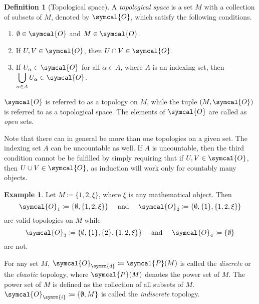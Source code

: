 \documentclass[a4 paper, 11pt]{book}
\theoremstyle{definition}
\newtheorem{defn}{Definition}
\newtheorem{exmp}{Example}
\newcommand{\topology}{\symcal{O}}
\newcommand{\powerset}{\symcal{P}}
\begin{document}
    \begin{defn}[Topological space]
        A \textit{topological space} is a set \(M\) with a collection of subsets of \(M\), denoted by \(\topology\), which satisfy the following conditions.
        \begin{enumerate}
            \item \(\emptyset \in \topology\) and \(M \in \topology\).
            \item If \(U, V \in \topology\), then \(U \cap V \in \topology\).
            \item If \(U_\alpha \in \topology\) for all \(\alpha \in A\), where \(A\) is an indexing set, then \(\displaystyle \bigcup_{\alpha \in A} U_\alpha \in \topology\). \label{topthirdcondition}
        \end{enumerate}
        \(\topology\) is referred to as a topology on \(M\), while the tuple \((M, \topology)\) is referred to as a topological space. The elements of \(\topology\) are called as \textit{open} sets.
    \end{defn}
    Note that there can in general be more than one topologies on a given set. The indexing set \(A\) can be uncountable as well. If \(A\) is uncountable, then the third condition cannot be be fulfilled by simply requiring that if \(U,V \in \topology\), then \(U \cup V \in \topology\), as induction will work only for countably many objects.
    \begin{exmp}
        Let \(M \coloneq \{1, 2, \xi\}\), where \(\xi\) is any mathematical object. Then \[\topology_1 \coloneq \{\emptyset, \{1, 2, \xi\}\} \quad \text{ and } \quad \topology_2 \coloneq \{\emptyset, \{1\}, \{1, 2, \xi\}\}\] are valid topologies on \(M\) while \[\topology_3 \coloneq \{\emptyset, \{1\}, \{2\}, \{1, 2, \xi\}\} \quad \text{ and } \quad \topology_4 \coloneq \{\emptyset\}\] are not.
    \end{exmp}
    For any set \(M\), \(\topology_{\symrm{d}} \coloneq \powerset(M)\) is called the \textit{discrete} or the \textit{chaotic} topology, where \(\powerset(M)\) denotes the power set of \(M\). The power set of \(M\) is defined as the collection of all subsets of \(M\). \(\topology_{\symrm{i}} \coloneq \{\emptyset, M\}\) is called the \textit{indiscrete} topology.
\end{document}
